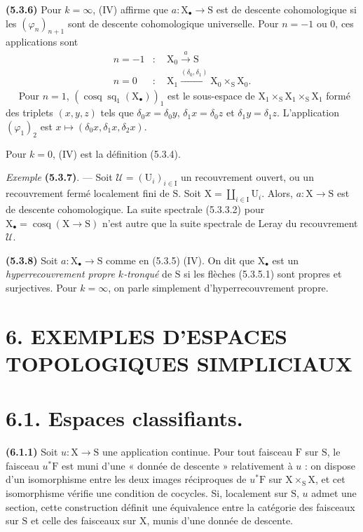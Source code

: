 \documentclass[11pt,leqno]{article}
\newcommand{\Page}[1]{\ifvmode\noindent\else\unskip\ \fi{\footnotesize\textcolor{gray}{[p.\,#1]}}\ \ignorespaces}
\begin{document}
\textbf{(5.3.6)} Pour \(k=\infty\), (IV) affirme que \(a:\mathrm{X}_{\bullet}\to\mathrm{S}\) est de descente cohomologique si les \((\varphi_n)_{n+1}\) sont de descente cohomologique universelle. Pour \(n=-1\) ou \(0\), ces applications sont
\[
\begin{aligned}
n=-1&:\quad \mathrm{X}_0\xrightarrow{a}\mathrm{S}\\
n=0&:\quad \mathrm{X}_1\xrightarrow{(\delta_0,\delta_1)}
\mathrm{X}_0\times_{\mathrm{S}}\mathrm{X}_0.
\end{aligned}
\]
\Page{16}
Pour \(n=1\), \((\operatorname{cosq}\operatorname{sq}_1(\mathrm{X}_{\bullet}))_1\) est le sous-espace de \(\mathrm{X}_1\times_{\mathrm{S}}\mathrm{X}_1\times_{\mathrm{S}}\mathrm{X}_1\) formé des triplets \((x,y,z)\) tels que \(\delta_0x=\delta_0y\), \(\delta_1x=\delta_0z\) et \(\delta_1y=\delta_1z\). L’application \((\varphi_1)_2\) est \(x\mapsto(\delta_0x,\delta_1x,\delta_2x)\).

Pour \(k=0\), (IV) est la définition (5.3.4).

\textit{Exemple} \textbf{(5.3.7)}. — Soit \(\mathcal{U}=(\mathrm{U}_i)_{i\in\mathrm{I}}\) un recouvrement ouvert, ou un recouvrement fermé localement fini de \(\mathrm{S}\). Soit \(\mathrm{X}=\coprod\limits_{i\in\mathrm{I}}\mathrm{U}_i\). Alors, \(a:\mathrm{X}\to\mathrm{S}\) est de descente cohomologique. La suite spectrale (5.3.3.2) pour \(\mathrm{X}_{\bullet}=\operatorname{cosq}(\mathrm{X}\to\mathrm{S})\) n’est autre que la suite spectrale de Leray du recouvrement \(\mathcal{U}\).

\textbf{(5.3.8)} Soit \(a:\mathrm{X}_{\bullet}\to\mathrm{S}\) comme en (5.3.5) (IV). On dit que \(\mathrm{X}_{\bullet}\) est un \textit{hyperrecouvrement propre \(k\)-tronqué} de \(\mathrm{S}\) si les flèches (5.3.5.1) sont propres et surjectives. Pour \(k=\infty\), on parle simplement d’hyperrecouvrement propre.

\section*{6. EXEMPLES D’ESPACES TOPOLOGIQUES SIMPLICIAUX}

\section*{6.1. Espaces classifiants.}

\textbf{(6.1.1)} Soit \(u:\mathrm{X}\to\mathrm{S}\) une application continue. Pour tout faisceau \(\mathrm{F}\) sur \(\mathrm{S}\), le faisceau \(u^*\mathrm{F}\) est muni d’une « donnée de descente » relativement à \(u\) : on dispose d’un isomorphisme entre les deux images réciproques de \(u^*\mathrm{F}\) sur \(\mathrm{X}\times_{\mathrm{S}}\mathrm{X}\), et cet isomorphisme vérifie une condition de cocycles. Si, localement sur \(\mathrm{S}\), \(u\) admet une section, cette construction définit une équivalence entre la catégorie des faisceaux sur \(\mathrm{S}\) et celle des faisceaux sur \(\mathrm{X}\), munis d’une donnée de descente.
\end{document}
